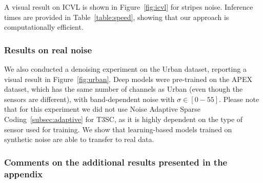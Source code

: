 A visual result on ICVL is shown in Figure~\ref{fig:icvl} for stripes noise.
Inference times are provided in Table~\ref{table:speed}, showing that our approach is computationally efficient.

\subsubsection{Results on real noise}

We also conducted a denoising experiment on the Urban dataset, reporting a visual result in Figure~\ref{fig:urban}. 
Deep models were pre-trained on the APEX dataset, which has the same number of channels as Urban (even though the sensors are different), with band-dependent noise with $\sigma \in [0-55] $.
Please note that for this experiment we did not use Noise Adaptive Sparse Coding~\ref{subsec:adaptive} for T3SC, as it is highly dependent on the type of sensor used for training.
We show that learning-based models trained on synthetic noise are able to transfer to real data.

\subsubsection{Comments on the additional results presented in the appendix}

